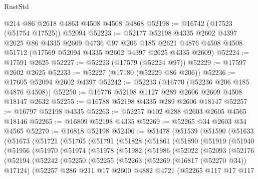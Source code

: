 \begin{lexlean}{RustStd}
\begin{coremodule}
    @214
    @86
    @2618
    @4863
    @4508
    @4508
    @4868
@52198 := @16742 (@17523 (@51754 @17525)) @52094
@52223 := @52177
    @52198
    @4335
    @2602
    @4397
    @2625
    @86
    @4335
    @2609
    @4736
    @97
    @206
    @185
    @2621
    @4876
    @4508
    @4508
    @51712
    (@17569 @52094 @4335 @2602 @4397 @2625 @4335 @2609)
@52224 := @17591 @2625
@52227 := @52223 (@17579 (@52224 @97))
@52229 := @17597 @2602 @2625
@52233 := @52227 (@17180 (@52229 @86 @206))
@52236 := @17605 @52094 @2602 @4397
@52242 := @52233 (@16770 (@52236 @206 @185 @4876 @4508))
@52250 := @16776 @52198 @1127 @289 @2606 @2609 @4508 @18147 @2632
@52255 := @16788 @52198 @4335 @289 @2606 @18147
@52257 := @16797 @52198 @4335
@52263 := @52257 @102 @288 @2603 @2605 @4565 @18146
@52265 := @16809 @52198 @4335
@52269 := @52265 @34 @2603 @34 @4565
@52270 := @16818 @52198
@52406 := @51478
    (@51539
      (@51590
        (@51633
          (@51673
            (@51721
              (@51765
                (@51791
                  (@51828
                    (@51861
                      (@51890
                        (@51919
                          (@51940
                            (@51956
                              (@51970
                                (@51974
                                  (@51978
                                    (@51982
                                      (@51986
                                        (@52022
                                          (@52093
                                            (@52176
                                              (@52194
                                                (@52242
                                                  (@52250
                                                    (@52255
                                                      (@52263
                                                        (@52269 (@16817 (@52270 @34)) @17124)
                                                        (@52257
                                                          @286
                                                          @211
                                                          @17
                                                          @2600
                                                          @4882
                                                          @4721
                                                          (@52265
                                                            @117
                                                            @17
                                                            @117

\end{coremodule}
\end{lexlean}
